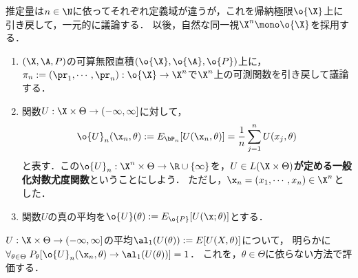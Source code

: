 \documentclass[uplatex,dvipdfmx]{jsreport}
\begin{document}
\begin{model}[$M$-推定量が定義可能なモデル]\label{model-for-M-estimator}
    推定量は$n\in\N$に依ってそれぞれ定義域が違うが，これを帰納極限$\o{\X}$上に引き戻して，一元的に議論する．
    以後，自然な同一視$\X^n\mono\o{\X}$を採用する．
    \begin{enumerate}
        \item $(\X,\A,P)$の可算無限直積$(\o{\X},\o{\A},\o{P})$上に，$\pi_n:=(\pr_1,\cdots,\pr_n):\o{\X}\to\X^n$で$\X^n$上の可測関数を引き戻して議論する．
        \item 関数$U:\X\times\Theta\to(-\infty,\infty]$に対して，
        \[\o{U}_n(\x_n,\theta):=E_{\bP_n}[U(\x_n,\theta)]=\frac{1}{n}\sum^n_{j=1}U(x_j,\theta)\]
        と表す．この$\o{U}_n:\X^n\times\Theta\to\R\cup\{\infty\}$を，\textbf{$U\in L(\X\times\Theta)$が定める一般化対数尤度関数}ということにしよう．
        ただし，$\x_n=(x_1,\cdots,x_n)\in\X^n$とした．
        \item 関数$U$の真の平均を$\o{U}(\theta):=E_{\o{P}}[U(\x;\theta)]$とする．
    \end{enumerate}
    $U:\X\times\Theta\to(-\infty,\infty]$の平均$\al_1(U(\theta)):=E[U(X,\theta)]$について，
    明らかに$\forall_{\theta\in\Theta}\;P_\theta[\o{U}_n(\x_n,\theta)\to\al_1(U(\theta))]=1$．
    これを，$\theta\in\Theta$に依らない方法で評価する．
\end{model}
\end{document}
